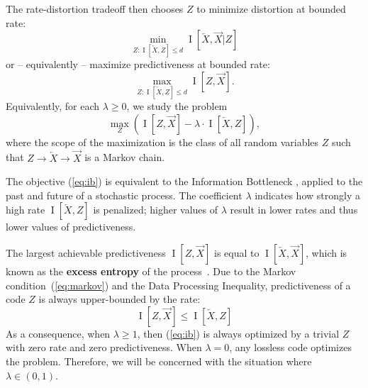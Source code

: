 \documentclass[entropy,article,submit,moreauthors,pdftex,10pt,a4paper]{Definitions/mdpi}
\newcommand{\future}{\overrightarrow{X}}
\newcommand{\past}{\overleftarrow{X}}
\newcommand{\key}{\textbf}
\begin{document}
The rate-distortion tradeoff then chooses $Z$ to %
 minimize distortion at bounded rate:
\begin{equation}
\min_{Z :  \operatorname{I}[\past, Z] \leq d}  \operatorname{I}[\past, \future|Z] 
\end{equation}
or -- equivalently -- maximize predictiveness at bounded rate:
\begin{equation}
\max_{Z :  \operatorname{I}[\past, Z] \leq d}  \operatorname{I}[Z, \future].
\end{equation}
Equivalently, for each  $\lambda \geq 0$, we study the problem 
\begin{equation}\label{eq:ib}
	\max_{Z} \left( \operatorname{I}[Z, \future] - \lambda \cdot \operatorname{I}[ \past, Z] \right),
\end{equation}
where the scope of the maximization is the class of all random variables $Z$ such that $Z \rightarrow \past \rightarrow \future$ is a Markov chain. %

The objective (\ref{eq:ib}) is equivalent to the Information Bottleneck \citep{tishby-information-1999}, applied to the past and future of a stochastic process.
The coefficient $\lambda$ indicates how strongly a high rate $\operatorname{I}[\past, Z]$ is penalized; higher values of $\lambda$ result in lower rates and thus lower values of predictiveness.

The largest achievable predictiveness $\operatorname{I}[Z, \future]$ is equal to $\operatorname{I}[\past, \future]$, which is known as the \key{excess entropy} of the process~\citep{feldman-synchronizing-2004}.
Due to the Markov condition~(\ref{eq:markov}) and the Data Processing Inequality, predictiveness of a code $Z$ is always upper-bounded by the rate:
\begin{equation}
\operatorname{I}[Z, \future] \leq \operatorname{I}[\past, Z] 
\end{equation}
As a consequence, when $\lambda \geq 1$, then (\ref{eq:ib}) is always optimized by a trivial $Z$ with zero rate and zero predictiveness.
When $\lambda = 0$, any lossless code optimizes the problem.
Therefore, we will be concerned with the situation where $\lambda \in (0,1)$.
\end{document}
